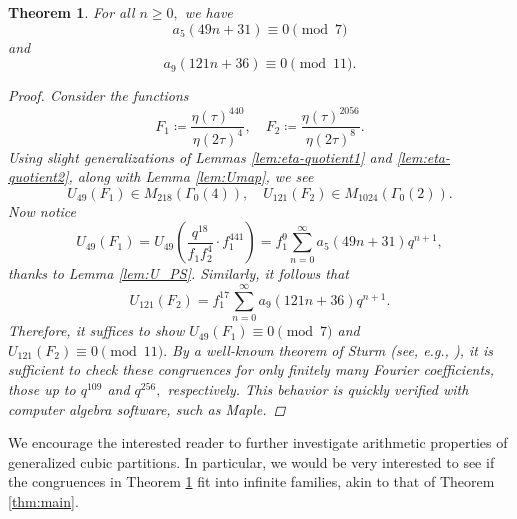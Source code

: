 \documentclass[12pt, reqno]{amsart}
\newtheorem{thm}{Theorem}[section]
\theoremstyle{definition}
\theoremstyle{remark}
\begin{document}
\begin{thm}\label{thm:further_congs}
For all $n \geq 0,$ we have 
\[a_5(49n+31) \equiv 0 \pmod{7}\]
and 
\[a_9(121n+36) \equiv 0 \pmod{11}.\]
\begin{proof}
Consider the functions 
\[F_1 \coloneqq \frac{\eta(\tau)^{440}}{\eta(2\tau)^4}, \quad F_2 \coloneqq \frac{\eta(\tau)^{2056}}{\eta(2\tau)^8}.\]
Using slight generalizations of Lemmas \ref{lem:eta-quotient1} and \ref{lem:eta-quotient2}, along with Lemma \ref{lem:Umap}, we see 
\[U_{49}(F_1) \in M_{218}(\Gamma_0(4)), \quad U_{121}(F_2)\in M_{1024}(\Gamma_0(2)).\]
Now notice
\[U_{49}(F_1) = U_{49}\left(\frac{q^{18}}{f_1 f_2^4} \cdot f_1^{441}\right) = f_1^9 \sum\limits_{n=0}^\infty a_5(49n+31) q^{n+1},\]
thanks to Lemma \ref{lem:U_PS}. Similarly, it follows that
\[U_{121}(F_2) = f_1^{17} \sum\limits_{n=0}^\infty a_9(121n+36)q^{n+1}.\]
Therefore, it suffices to show $U_{49}(F_1) \equiv 0 \pmod{7}$ and $U_{121}(F_2) \equiv 0 \pmod{11}.$ By a well-known theorem of Sturm (see, e.g., \cite{Sturm}), it is sufficient to check these congruences for only finitely many Fourier coefficients, those up to $q^{109}$ and $q^{256},$ respectively. This behavior is quickly verified with computer algebra software, such as Maple. 
\end{proof}
\end{thm}

We encourage the interested reader to further investigate arithmetic properties of generalized cubic partitions. In particular, we would be very interested to see if the congruences in Theorem \ref{thm:further_congs} fit into infinite families, akin to that of Theorem \ref{thm:main}. 



\appendix
\end{document}
